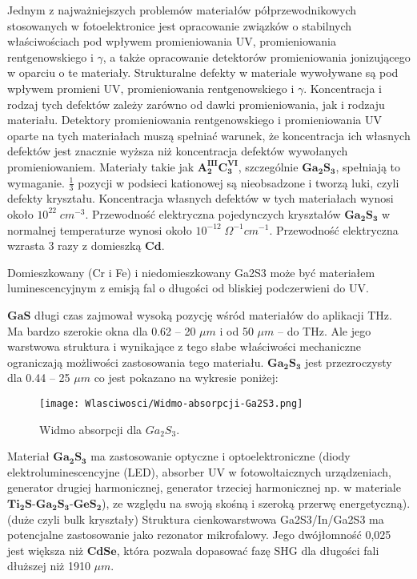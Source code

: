 Jednym z najważniejszych problemów materiałów półprzewodnikowych stosowanych w fotoelektronice jest opracowanie związków o stabilnych właściwościach pod wpływem promieniowania UV, promieniowania rentgenowskiego i $\gamma$, a także opracowanie detektorów promieniowania jonizującego w oparciu o te materiały. Strukturalne defekty w materiale wywoływane są pod wpływem promieni UV, promieniowania rentgenowskiego i $\gamma$. Koncentracja i rodzaj tych defektów zależy zarówno od dawki promieniowania, jak i rodzaju materiału. Detektory promieniowania rentgenowskiego i promieniowania UV oparte na tych materiałach muszą spełniać warunek, że koncentracja ich własnych defektów jest znacznie wyższa niż koncentracja defektów wywołanych promieniowaniem. Materiały takie jak $\mathbf{A_{2}^{III}C_{3}^{VI}}$, szczególnie $\mathbf{Ga_{2}S_{3}}$, spełniają to wymaganie. $\frac{1}{3}$ pozycji w podsieci kationowej są nieobsadzone i tworzą luki, czyli defekty kryształu. Koncentracja własnych defektów w tych materiałach wynosi około $10^{22}\;cm^{-3}$. Przewodność elektryczna pojedynczych kryształów $\mathbf{Ga_{2}S_{3}}$ w normalnej temperaturze wynosi około $10^{-12}\;\Omega^{-1}cm^{-1}$. Przewodność elektryczna wzrasta 3 razy z domieszką $\mathbf{Cd}$.

Domieszkowany (Cr i Fe) i niedomieszkowany Ga2S3 może być materiałem luminescencyjnym z emisją fal o długości od bliskiej podczerwieni do UV.

$\mathbf{GaS}$ długi czas zajmował wysoką pozycję wśród materiałów do aplikacji THz. Ma bardzo szerokie okna dla 0.62 – 20 $\mu m$ i od 50 $\mu m$ – do THz. Ale jego warstwowa struktura i wynikające z tego słabe właściwości mechaniczne ograniczają możliwości zastosowania tego materiału. $\mathbf{Ga_{2}S_{3}}$ jest przezroczysty dla 0.44 – 25 $\mu m$ co jest pokazano na wykresie poniżej:

\begin{figure}[H]
	\begin{center}
		\texttt{[image: Wlasciwosci/Widmo-absorpcji-Ga2S3.png]}
		\caption{Widmo absorpcji dla $Ga_{2}S_{3}$.}
	\end{center}
\end{figure}

Materiał $\mathbf{Ga_{2}S_{3}}$ ma zastosowanie optyczne i optoelektroniczne (diody elektroluminescencyjne (LED), absorber UV w fotowoltaicznych urządzeniach, generator drugiej harmonicznej, generator trzeciej harmonicznej np. w materiale $\mathbf{Ti_{2}S}$-$\mathbf{Ga_{2}S_{3}}$-$\mathbf{GeS_{2}}$), ze względu na swoją skośną i szeroką przerwę energetyczną). (duże czyli bulk kryształy) Struktura cienkowarstwowa Ga2S3/In/Ga2S3 ma potencjalne zastosowanie jako rezonator mikrofalowy. Jego dwójłomność 0,025 jest większa niż $\mathbf{CdSe}$, która pozwala dopasować fazę SHG dla długości fali dłuższej niż 1910 $\mu m$.

